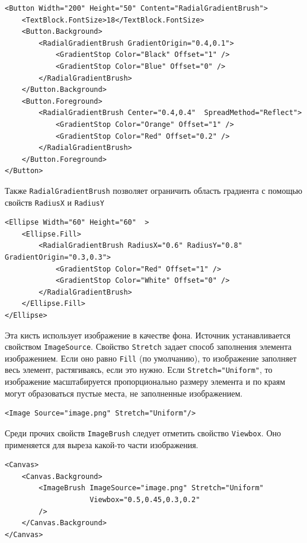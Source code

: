 \begin{description}[style=nextline]
\begin{verbatim}
<Button Width="200" Height="50" Content="RadialGradientBrush">
    <TextBlock.FontSize>18</TextBlock.FontSize>
    <Button.Background>
        <RadialGradientBrush GradientOrigin="0.4,0.1">
            <GradientStop Color="Black" Offset="1" />
            <GradientStop Color="Blue" Offset="0" />
        </RadialGradientBrush>
    </Button.Background>
    <Button.Foreground>
        <RadialGradientBrush Center="0.4,0.4"  SpreadMethod="Reflect">
            <GradientStop Color="Orange" Offset="1" />
            <GradientStop Color="Red" Offset="0.2" />
        </RadialGradientBrush>
    </Button.Foreground>
</Button>
\end{verbatim}

Также \texttt{RadialGradientBrush} позволяет ограничить область градиента с помощью свойств \texttt{RadiusX} и \texttt{RadiusY}

\begin{verbatim}
<Ellipse Width="60" Height="60"  >
    <Ellipse.Fill>
        <RadialGradientBrush RadiusX="0.6" RadiusY="0.8" GradientOrigin="0.3,0.3">
            <GradientStop Color="Red" Offset="1" />
            <GradientStop Color="White" Offset="0" />
        </RadialGradientBrush>
    </Ellipse.Fill>
</Ellipse>
\end{verbatim}

\item [\texttt{ImageBrush}] Эта кисть использует изображение в качестве фона. Источник устанавливается свойством \texttt{ImageSource}. Свойство \texttt{Stretch} задает способ заполнения элемента изображением. Если оно равно \texttt{Fill} (по умолчанию), то изображение заполняет весь элемент, растягиваясь, если это нужно. Если \texttt{Stretch="Uniform"}, то изображение масштабируется пропорционально размеру элемента и по краям могут образоваться пустые места, не заполненные изображением.

\begin{verbatim}
<Image Source="image.png" Stretch="Uniform"/>
\end{verbatim}

Среди прочих свойств \texttt{ImageBrush} следует отметить свойство \texttt{Viewbox}. Оно применяется для выреза какой-то части изображения. 

\begin{verbatim}
<Canvas>
    <Canvas.Background>
        <ImageBrush ImageSource="image.png" Stretch="Uniform"
                    Viewbox="0.5,0.45,0.3,0.2" 
        />
    </Canvas.Background>
</Canvas>
\end{verbatim}


\end{description}
